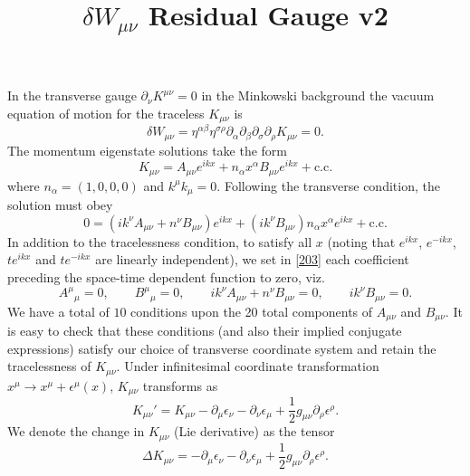 \documentclass[10pt,letterpaper]{article}
\title{$\delta W_{\mu\nu}$ Residual Gauge v2}
\author{}
\date{}
\begin{document}
\maketitle
In the transverse gauge $\partial_\nu K^{\mu\nu} = 0$ in the Minkowski background the vacuum equation of motion for the traceless $K_{\mu\nu}$ is
\begin{equation}
\delta W_{\mu\nu} = \eta^{\alpha\beta} \eta^{\sigma\rho}\partial_\alpha\partial_\beta\partial_\sigma\partial_\rho K_{\mu\nu} =0.
\end{equation}
The momentum eigenstate solutions take the form 
\begin{equation}
K_{\mu\nu} = A_{\mu\nu}e^{ikx} + n_\alpha x^\alpha B_{\mu\nu} e^{ikx} +\text{c.c.}\label{202}
\end{equation}
where $n_\alpha = (1,0,0,0)$ and $k^\mu k_{\mu} = 0$. Following the transverse condition, the solution must obey
\begin{equation}
0=\left(ik^\nu A_{\mu\nu} + n^\nu B_{\mu\nu}\right)e^{ikx}
+ \left( ik^\nu B_{\mu\nu}\right) n_\alpha x^\alpha  e^{ikx}+ \text{c.c.}\label{203}
\end{equation}
In addition to the tracelessness condition, to satisfy all $x$ (noting that $e^{ikx}$, $e^{-ikx}$, $te^{ikx}$ and $te^{-ikx}$ are linearly independent), we set in \eqref{203} each coefficient preceding the space-time dependent function to zero, viz.
\begin{equation}
A^\mu{}_\mu = 0,\qquad B^\mu{}_\mu=0,\qquad ik^\nu A_{\mu\nu} + n^\nu B_{\mu\nu}= 0,\qquad i k^\nu B_{\mu\nu} = 0.
\end{equation}
We have a total of $10$ conditions upon the 20 total components of $A_{\mu\nu}$ and $B_{\mu\nu}$. 
It is easy to check that these conditions (and also their implied conjugate expressions) satisfy our choice of transverse coordinate system and retain the tracelessness of $K_{\mu\nu}$. 
Under infinitesimal coordinate transformation $x^\mu \to x^\mu + \epsilon^\mu(x)$, $K_{\mu\nu}$ transforms as
\begin{equation}
	K_{\mu\nu}' = K_{\mu\nu} - \partial_\mu \epsilon_\nu - \partial_\nu\epsilon_\mu + \frac12 g_{\mu\nu} \partial_\rho \epsilon^\rho.
\end{equation}
We denote the change in $K_{\mu\nu}$ (Lie derivative) as the tensor
\begin{equation}
\Delta K_{\mu\nu} = - \partial_\mu \epsilon_\nu - \partial_\nu\epsilon_\mu + \frac12 g_{\mu\nu} \partial_\rho \epsilon^\rho.\label{207}
\end{equation}
\end{document}
